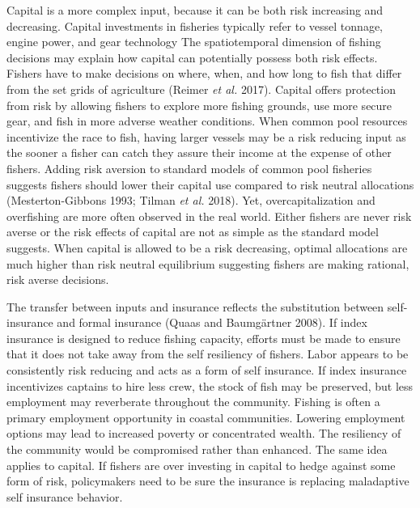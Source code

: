 \documentclass[
  letterpaper,
  DIV=11,
  numbers=noendperiod]{scrartcl}
\theoremstyle{plain}
\theoremstyle{plain}
\theoremstyle{remark}
\begin{document}
Capital is a more complex input, because it can be both risk increasing
and decreasing. Capital investments in fisheries typically refer to
vessel tonnage, engine power, and gear technology The spatiotemporal
dimension of fishing decisions may explain how capital can potentially
possess both risk effects. Fishers have to make decisions on where,
when, and how long to fish that differ from the set grids of agriculture
(Reimer \emph{et al.} 2017). Capital offers protection from risk by
allowing fishers to explore more fishing grounds, use more secure gear,
and fish in more adverse weather conditions. When common pool resources
incentivize the race to fish, having larger vessels may be a risk
reducing input as the sooner a fisher can catch they assure their income
at the expense of other fishers. Adding risk aversion to standard models
of common pool fisheries suggests fishers should lower their capital use
compared to risk neutral allocations (Mesterton-Gibbons 1993; Tilman
\emph{et al.} 2018). Yet, overcapitalization and overfishing are more
often observed in the real world. Either fishers are never risk averse
or the risk effects of capital are not as simple as the standard model
suggests. When capital is allowed to be a risk decreasing, optimal
allocations are much higher than risk neutral equilibrium suggesting
fishers are making rational, risk averse decisions.

The transfer between inputs and insurance reflects the substitution
between self-insurance and formal insurance (Quaas and Baumgärtner
2008). If index insurance is designed to reduce fishing capacity,
efforts must be made to ensure that it does not take away from the self
resiliency of fishers. Labor appears to be consistently risk reducing
and acts as a form of self insurance. If index insurance incentivizes
captains to hire less crew, the stock of fish may be preserved, but less
employment may reverberate throughout the community. Fishing is often a
primary employment opportunity in coastal communities. Lowering
employment options may lead to increased poverty or concentrated wealth.
The resiliency of the community would be compromised rather than
enhanced. The same idea applies to capital. If fishers are over
investing in capital to hedge against some form of risk, policymakers
need to be sure the insurance is replacing maladaptive self insurance
behavior.
\end{document}
